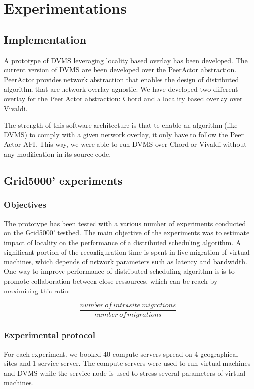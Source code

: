 \section{Experimentations}

\subsection{Implementation}

A prototype of DVMS leveraging locality based overlay has been developed. The 
current version of DVMS are been developed over the PeerActor abstraction. 
PeerActor provides network abstraction that enables the design of distributed
algorithm that are network overlay agnostic. We have developed two different
overlay for the Peer Actor abstraction: Chord and a locality based overlay over
Vivaldi.

The strength of this software architecture is that to enable an algorithm (like
DVMS) to comply with a given network overlay, it only have to follow the Peer 
Actor API. This way, we were able to run DVMS over Chord or Vivaldi without any
modification in its source code.

\subsection{Grid5000' experiments}

\subsubsection{Objectives}
The prototype has been tested with a various number of experiments conducted on
the Grid5000' testbed. The main objective of the experiments was to estimate
impact of locality on the performance of a distributed scheduling algorithm. 
A significant portion of the reconfiguration time is spent in live migration of
virtual machines, which depends of network parameters such as latency and
bandwidth. One way to improve performance of distributed scheduling algorithm is
is to promote collaboration between close ressources, which can be reach by 
maximising this ratio:

\[
	\frac{number\ of\ intrasite\ migrations}{number\ of\ migrations}
\]

\subsubsection{Experimental protocol}
For each experiment, we booked 40 compute servers spread on 4 geographical sites
and 1 service server. The compute servers were used to run virtual machines and
DVMS while the service node is used to stress several parameters of 
virtual machines.

